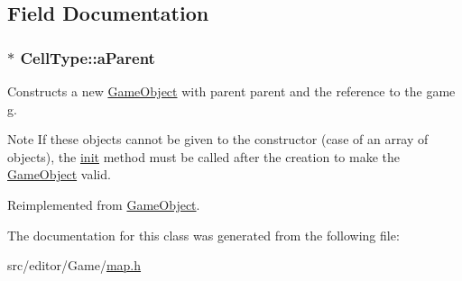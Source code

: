 \subsection{\-Field \-Documentation}
\hypertarget{class_cell_type_a7ac20d29216624b54218a54bde6593f2}{
\subsubsection[{a\-Parent}]{$\ast$ {\bf \-Cell\-Type\-::a\-Parent}}}\label{class_cell_type_a7ac20d29216624b54218a54bde6593f2}
\-Constructs a new \hyperlink{class_game_object}{\-Game\-Object} with parent {\ttfamily parent} and the reference to the game {\ttfamily g}.

\begin{DoxyNote}{\-Note}
\-If these objects cannot be given to the constructor (case of an array of objects), the \hyperlink{class_game_object_a97be7b59b2e76e7d60de2146b894eed9}{init} method must be called after the creation to make the \hyperlink{class_game_object}{\-Game\-Object} valid. 
\end{DoxyNote}


\-Reimplemented from \hyperlink{class_game_object_a41d4afe43f955e78ede0bbd4ad8957f8}{\-Game\-Object}.



\-The documentation for this class was generated from the following file\-:\begin{DoxyCompactItemize}
\item 
src/editor/\-Game/\hyperlink{map_8h}{map.\-h}\end{DoxyCompactItemize}
